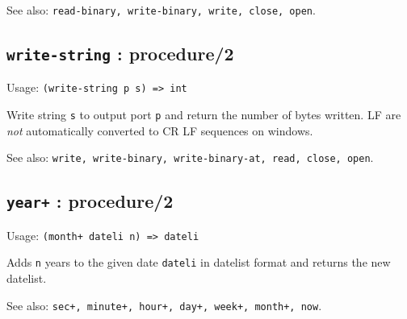 \documentclass[
]{article}
\newcommand{\passthrough}[1]{#1}
\begin{document}
See also:
\passthrough{\lstinline!read-binary, write-binary, write, close, open!}.

\hypertarget{write-string-procedure2-1}{%
\subsection{\texorpdfstring{\texttt{write-string} :
procedure/2}{write-string : procedure/2}}\label{write-string-procedure2-1}}

Usage: \passthrough{\lstinline!(write-string p s) => int!}

Write string \passthrough{\lstinline!s!} to output port
\passthrough{\lstinline!p!} and return the number of bytes written. LF
are \emph{not} automatically converted to CR LF sequences on windows.

See also:
\passthrough{\lstinline!write, write-binary, write-binary-at, read, close, open!}.

\hypertarget{year-procedure2-1}{%
\subsection{\texorpdfstring{\texttt{year+} :
procedure/2}{year+ : procedure/2}}\label{year-procedure2-1}}

Usage: \passthrough{\lstinline!(month+ dateli n) => dateli!}

Adds \passthrough{\lstinline!n!} years to the given date
\passthrough{\lstinline!dateli!} in datelist format and returns the new
datelist.

See also:
\passthrough{\lstinline!sec+, minute+, hour+, day+, week+, month+, now!}.
\end{document}
